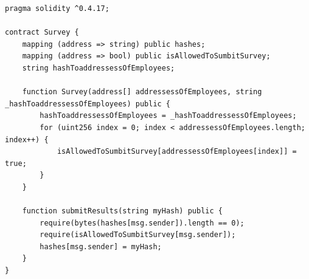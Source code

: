 \documentclass[portrait,a4paper]{article}
\begin{document}
   		\begin{lstlisting}
pragma solidity ^0.4.17;

contract Survey {
    mapping (address => string) public hashes;
    mapping (address => bool) public isAllowedToSumbitSurvey;
    string hashToaddressessOfEmployees;

    function Survey(address[] addressessOfEmployees, string _hashToaddressessOfEmployees) public {
        hashToaddressessOfEmployees = _hashToaddressessOfEmployees;
        for (uint256 index = 0; index < addressessOfEmployees.length; index++) {
            isAllowedToSumbitSurvey[addressessOfEmployees[index]] = true;
        }
    }

    function submitResults(string myHash) public {
        require(bytes(hashes[msg.sender]).length == 0);
        require(isAllowedToSumbitSurvey[msg.sender]);
        hashes[msg.sender] = myHash;
    }
}
		\end{lstlisting}

\clearpage
\end{document}
